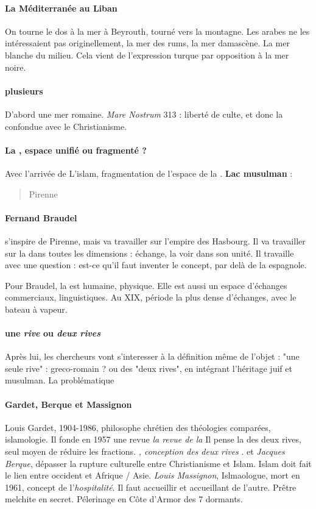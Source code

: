 \paragraph{La Méditerranée au Liban} On tourne le dos à la mer à Beyrouth, tourné vers la montagne. Les arabes ne les intéressaient pas originellement, la mer des rums, la mer damascène. La mer blanche du milieu. Cela vient de l'expression turque par opposition à la mer noire.

\paragraph{plusieurs \Med}

D'abord une mer romaine. \textit{Mare Nostrum}
313 : liberté de culte, et donc la \Med confondue avec le Christianisme. 

\paragraph{La \Med, espace unifié ou fragmenté ?} Avec l'arrivée de L'islam, fragmentation de l'espace de la \Med. \textbf{Lac musulman} : 

\begin{quote}
    Pirenne
\end{quote}

\paragraph{Fernand Braudel} s'inspire de Pirenne, mais va travailler sur l'empire des Hasbourg. Il va travailler sur la \Med dans toutes les dimensions : échange, la voir dans son unité. Il travaille avec une question : est-ce qu'il faut inventer le concept, par delà de la \Med espagnole. 


Pour Braudel, la \Med est humaine, physique. Elle est aussi un espace d'échanges commerciaux, linguistiques. Au XIX, période la plus dense d'échanges, avec le bateau à vapeur. 


\paragraph{une \textit{rive} ou \textit{deux rives}}Après lui, les chercheurs vont s'interesser à la définition même de l'objet : "une seule rive" : greco-romain ? ou des "deux rives", en intégrant l'héritage juif et musulman. La problématique 

\paragraph{Gardet, Berque et Massignon}{Louis Gardet, 1904-1986, philosophe chrétien des théologies comparées, islamologie. Il fonde en 1957 une revue \textit{la revue de la \Med}Il pense la \Med des deux rives, seul moyen de réduire les fractions. \textit{\Med, conception des deux rives } }. et \textit{Jacques Berque}, dépasser la rupture culturelle entre Christianisme et Islam. Islam doit fait le lien entre occident et Afrique / Asie. \textit{Louis Massignon}, Islmaologue, mort en 1961, concept de l'\textit{hospitalité}. Il faut accueillir et accueillant de l'autre. Prêtre melchite en secret. Pélerinage en Côte d'Armor des 7 dormants.


